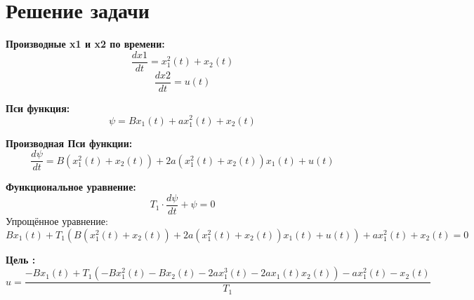 \documentclass{article}
\begin{document}
\section*{Решение задачи}
\textbf{Производные x1 и x2 по времени:} \\
\[
\frac{dx1}{dt} = x_{1}^{2}{\left(t \right)} + x_{2}{\left(t \right)}
\]
\[
\frac{dx2}{dt} = u{\left(t \right)}
\]

\textbf{Пси функция:} \\
\[
\psi = B x_{1}{\left(t \right)} + a x_{1}^{2}{\left(t \right)} + x_{2}{\left(t \right)}
\]

\textbf{Производная Пси функции:} \\
\[
\frac{d\psi}{dt} = B \left(x_{1}^{2}{\left(t \right)} + x_{2}{\left(t \right)}\right) + 2 a \left(x_{1}^{2}{\left(t \right)} + x_{2}{\left(t \right)}\right) x_{1}{\left(t \right)} + u{\left(t \right)}
\]

\textbf{Функциональное уравнение:} \\
\[
T_1 \cdot \frac{d\psi}{dt} + \psi = 0
\]
Упрощённое уравнение: \\
\[
B x_{1}{\left(t \right)} + T_{1} \left(B \left(x_{1}^{2}{\left(t \right)} + x_{2}{\left(t \right)}\right) + 2 a \left(x_{1}^{2}{\left(t \right)} + x_{2}{\left(t \right)}\right) x_{1}{\left(t \right)} + u{\left(t \right)}\right) + a x_{1}^{2}{\left(t \right)} + x_{2}{\left(t \right)} = 0
\]

\textbf{Цель :} \\
\[
u = \frac{- B x_{1}{\left(t \right)} + T_{1} \left(- B x_{1}^{2}{\left(t \right)} - B x_{2}{\left(t \right)} - 2 a x_{1}^{3}{\left(t \right)} - 2 a x_{1}{\left(t \right)} x_{2}{\left(t \right)}\right) - a x_{1}^{2}{\left(t \right)} - x_{2}{\left(t \right)}}{T_{1}}
\]
\end{document}
